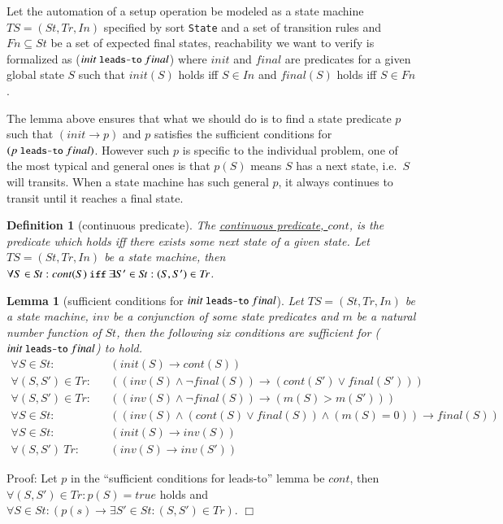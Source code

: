 \documentclass[12pt]{report}
\newtheorem{lemma}{Lemma}
\newtheorem{definition}{Definition}
\newcommand{\ra}{\rightarrow}
\newcommand{\mbstt}[1]{\mbox{\small{\tt {#1}}}}
\newcommand{\ul}{\underline}
\begin{document}
Let the automation of a setup operation be modeled as a state machine
$TS=(S\!t,T\!r,In)$ specified by sort {\tt State} and a set of transition
rules
and
$Fn\subseteq S\!t$ be a set of expected final states, reachability
we want to verify is formalized as ($init~\mbstt{leads-to}~final$) where
$init$ and $final$ are predicates for a given global state $S$ such
that $init(S)$ holds iff $S \in In$ and $final(S)$ holds iff $S \in
Fn$. 

The lemma above ensures that what we should do is to find a state
predicate $p$ such that $(init\ra p)$ and $p$ satisfies the sufficient
conditions for $(p~\mbstt{leads-to}~final)$. However such $p$ is
specific to the individual problem, one of the most typical and
general ones is that $p(S)$ means $S$ has a next state, i.e.\ $S$ will
transits.  When a state machine has such general $p$, it always
continues to transit until it reaches a final state.

\begin{definition}[continuous predicate]
  The \ul{continuous predicate, $cont$}, is the predicate which holds
  iff there exists some next state of a given state.  Let
  $TS=(S\!t,T\!r,In)$ be a state machine, then $\forall S\in S\!t:cont(S)
  ~\mbstt{iff}~ \exists S'\in S\!t:(S,S')\in T\!r$.
\end{definition}

\begin{lemma}[sufficient conditions for $init~\mbstt{leads-to}~final$]
  Let $TS=(S\!t,T\!r,In)$ be a state machine, $inv$ be a conjunction of
  some state predicates and $m$ be a natural number function of $S\!t$,
  then the following six conditions are sufficient for
  ($init~\mbstt{leads-to}~final$) to hold.
  \begin{eqnarray}
  \label{exp:cond1}
  \forall S\in S\!t:&&(init(S)\ra cont(S))\\
  \label{exp:cond2}
  \forall (S,S')\in T\!r:&&((inv(S)\land\neg final(S))
  \ra(cont(S')\lor final(S')))\\
  \label{exp:cond3}
  \forall (S,S')\in T\!r:&&((inv(S)\land\neg final(S))\ra(m(S)> m(S')))\\
  \label{exp:cond4}
  \forall S\in S\!t:&&((inv(S)\land (cont(S)\lor final(S))
  \land(m(S) = 0))\ra final(S))\\
  \label{exp:cond5}
  \forall S\in S\!t:&&(init(S)\ra inv(S))\\
  \label{exp:cond6}
  \forall (S,S')\ T\!r:&&(inv(S)\ra inv(S'))
  \end{eqnarray}
\end{lemma}
Proof: Let $p$ in the ``sufficient conditions for leads-to'' lemma
be $cont$, then $\forall (S,S')\in T\!r:p(S)=true$ holds and
$\forall S\in S\!t:(p(s)\ra\exists S'\in S\!t:(S,S')\in T\!r)$. $\Box$\\
\end{document}
